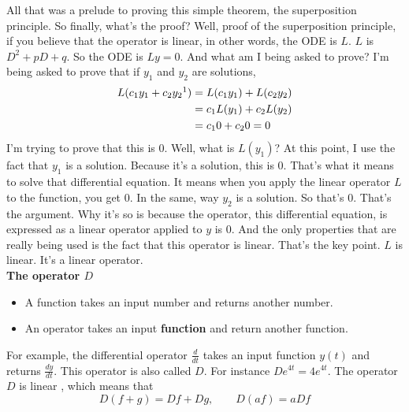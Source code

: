 All that was a prelude to proving this simple theorem, the superposition principle.
So finally, what's the proof?
Well, proof of the superposition principle, if you believe that the operator is linear,
in other words, the ODE is $L$.
$L$ is $D^2 +  pD +  q$. So the ODE is $Ly = 0$.
And what am I being asked to prove?
I'm being asked to prove that if $y _1$ and $y _2$ are solutions,
\begin{align*}
  L(c_1 y _1 + c_2 y_2 \footnotemark) &= L(c_1 y _1) + L(c _2 y _2) \\
                                      &= c _1 L(y _1) + c _2 L(y _2) \\
                                      &= c _1 0 + c _2 0 = 0                                        
\end{align*}
I'm trying to prove that this is $0$.
Well, what is $L(y _1)$?
At this point, I use the fact that $y_1$ is a solution.
Because it's a solution, this is $0$. That's what it means to solve that differential equation.
It means when you apply the linear operator $L$ to the function, you get $0$.
In the same, way $y _2$ is a solution. So that's $0$. 
That's the argument.
Why it's so is because the operator, this differential equation, is expressed as a linear operator applied
to $y$ is $0$.
And the only properties that are really being used is the fact that this operator is linear.
That's the key point. $L$ is linear.
It's a linear operator.\\

\textbf{\color{blue} The operator $D$}
\begin{itemize}
\item A function takes an input number and returns another number.
\item An {\color{blue} operator} takes an input \textbf{function} and return another function. 
\end{itemize}

For example, the {\color{blue} differential operator} $\frac{d}{dt}$ takes an input function
$y(t)$ and returns $\frac{dy}{dt}$.
This operator is also called {\color{blue} $D$}.
For instance $De^{4t} = 4e^{4t}$. The operator $D$ is {\color{blue} linear} ,
which means that
\begin{equation*}
  D(f+g) = Df + Dg, \qquad D(af) = a Df
\end{equation*}

